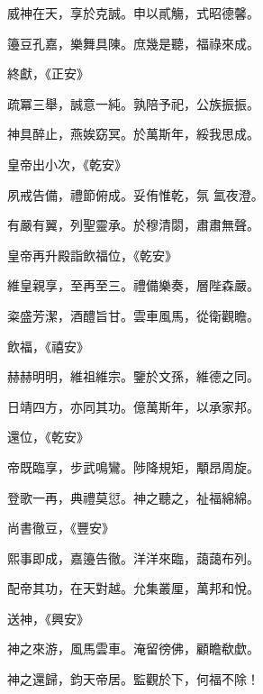 \begin{pinyinscope}
 威神在天，享於克誠。申以貳觴，式昭德馨。



 籩豆孔嘉，樂舞具陳。庶幾是聽，福祿來成。



 終獻，《正安》



 疏冪三舉，誠意一純。孰陪予祀，公族振振。



 神具醉止，燕娭窈冥。於萬斯年，綏我思成。



 皇帝出小次，《乾安》



 夙戒告備，禮節俯成。妥侑惟乾，氛
 氳夜澄。



 有嚴有翼，列聖靈承。於穆清閟，肅肅無聲。



 皇帝再升殿詣飲福位，《乾安》



 維皇親享，至再至三。禮備樂奏，層陛森嚴。



 粢盛芳潔，酒醴旨甘。雲車風馬，從衛觀瞻。



 飲福，《禧安》



 赫赫明明，維祖維宗。鑒於文孫，維德之同。



 日靖四方，亦同其功。億萬斯年，以承家邦。



 還位，《乾安》



 帝既臨享，步武鳴鸞。陟降規矩，顒昂周旋。



 登歌一再，典禮莫愆。神之聽之，祉福綿綿。



 尚書徹豆，《豐安》



 熙事即成，嘉籩告徹。洋洋來臨，藹藹布列。



 配帝其功，在天對越。允集叢厘，萬邦和悅。



 送神，《興安》



 神之來游，風馬雲車。淹留徬佛，顧瞻欷歔。



 神之還歸，鈞天帝居。監觀於下，何福不除！




\end{pinyinscope}
